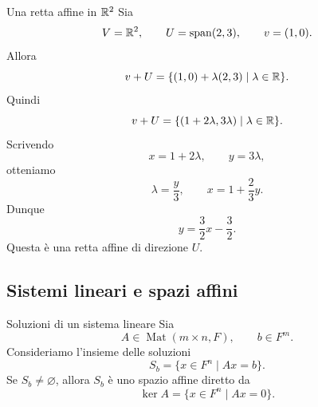 \documentclass[a4paper]{article}
\begin{document}
\begin{snippetexample}{Una retta affine in \(\mathbb{R}^2\)}
    Sia
    \[
        V=\mathbb{R}^2,
        \qquad
        U=\operatorname{span}(2,3),
        \qquad
        v=(1,0).
    \]
    Allora
    \[
        v+U
        =
        \{(1,0)+\lambda(2,3)\mid \lambda\in\mathbb{R}\}.
    \]
    Quindi
    \[
        v+U
        =
        \{(1+2\lambda,3\lambda)\mid \lambda\in\mathbb{R}\}.
    \]
    Scrivendo
    \[
        x=1+2\lambda,
        \qquad
        y=3\lambda,
    \]
    otteniamo
    \[
        \lambda=\frac{y}{3},
        \qquad
        x=1+\frac{2}{3}y.
    \]
    Dunque
    \[
        y=\frac{3}{2}x-\frac{3}{2}.
    \]
    Questa è una retta affine di direzione \(U\).

    \begin{center}
    \end{center}
\end{snippetexample}

\subsection{Sistemi lineari e spazi affini}

\begin{snippetproposition}{Soluzioni di un sistema lineare}
    Sia
    \[
        A\in\operatorname{Mat}(m\times n,F),
        \qquad
        b\in F^m.
    \]
    Consideriamo l'insieme delle soluzioni
    \[
        S_b=\{x\in F^n\mid Ax=b\}.
    \]
    Se \(S_b\neq\varnothing\), allora \(S_b\) è uno spazio affine diretto da
    \[
        \ker A=\{x\in F^n\mid Ax=0\}.
    \]
\end{snippetproposition}
\end{document}
